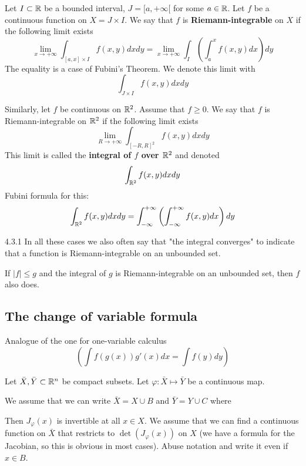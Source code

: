 Let $I \subset \mathbb{R}$ be a bounded interval, $J = [a, +\infty[$ for some $a \in \mathbb{R}$.
Let $f$ be a continuous function on $X = J \times I$.
We say that $f$ is \textbf{Riemann-integrable} on $X$ if the following limit exists
\[ \lim_{x \to +\infty} \int_{[a,x] \times I} f(x,y) dx dy = \lim_{x \to +\infty} \int_I \left( \int_a^x f(x,y)dx \right)dy \]
The equality is a case of Fubini's Theorem.
We denote this limit with
\[ \int_{J \times I} f(x,y) dx dy \]


Similarly, let $f$ be continuous on $\mathbb{R}^2$. Assume that $f \ge 0$. We say that $f$ is Riemann-integrable on
$\mathbb{R}^2$ if the following limit exists
\[ \lim_{R \to +\infty} \int_{[-R, R]^2} f(x,y)dxdy \]
This limit is called the \textbf{integral of $f$ over $\mathbb{R}^2$} and denoted
\[ \int_{\mathbb{R}^2} f(x, y)dxdy \]
Fubini formula for this:
\[ \int_{\mathbb{R}^2} f(x,y)dxdy = \int_{-\infty}^{+\infty} \left( \int_{-\infty}^{+\infty} f(x,y)dx \right) dy \]

\begin{remark}{4.3.1}
    In all these cases we also often say that "the integral converges"
    to indicate that a function is Riemann-integrable on an unbounded set.

    If $|f| \le g$ and the integral of $g$ is Riemann-integrable on an unbounded set, then $f$ also
    does.
\end{remark}

\subsection{The change of variable formula}

Analogue of the one for one-variable calculus
\[ \left( \int f(g(x))g'(x)dx = \int f(y) dy \right) \]

Let $\bar{X}, \bar{Y} \subset \mathbb{R}^n$ be compact subsets. Let $\varphi: \bar{X} \mapsto \bar{Y}$ be a continuous map.

We assume that we can write $\bar{X} = X \cup B$ and $\bar{Y} = Y \cup C$ where

Then $J_\varphi(x)$ is invertible at all $x \in X$.
We assume that we can find a continuous function on $\bar{X}$ that restricts to $\det(J_\varphi(x))$ on $X$ (we have a formula for the Jacobian,
so this is obvious in most cases). Abuse notation and write it even if $x \in B$.

